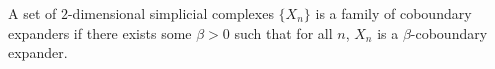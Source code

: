 \begin{definition}
    A set of $2$-dimensional simplicial complexes $\{X_n\}$ is a family of coboundary expanders if there exists some $\beta >0$ such that for all $n$, $X_n$ is a $\beta$-coboundary expander. 
\end{definition}
     



